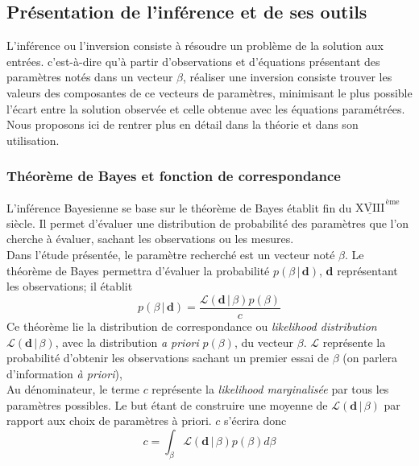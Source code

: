 \documentclass[a4paper,12pt]{article}
\newcommand{\bepar}[1]{
	\left( #1 \right)  
}
\newcommand\bk{\color{black}}
\newcommand\brick{\color{brick}}
\newcommand\dsb{\color{dsb}}
\newcommand{\cad}{c'est-à-dire}
\numberwithin{equation}{section} %
\begin{document}
 
\brick \subsection{Présentation de l'inférence et de ses outils} \bk
\noindent L'inférence ou l'inversion consiste à résoudre un problème de la solution aux entrées. \cad $ $ qu'à partir d'observations et d'équations présentant des paramètres notés dans un vecteur $\beta$, réaliser une inversion consiste trouver les valeurs des composantes de ce vecteurs de paramètres, minimisant le plus possible l'écart entre la solution observée et celle obtenue avec les équations paramétrées. \\
Nous proposons ici de rentrer plus en détail dans la théorie et dans son utilisation.

\dsb \subsubsection{Théorème de Bayes et fonction de correspondance} \bk
\noindent L'inférence Bayesienne se base sur le théorème de Bayes établit fin du $\overline{\underline{\text{XVIII}}}^{\, \text{ème}}$ siècle. Il permet d'évaluer une distribution de probabilité des paramètres que l'on cherche à évaluer, sachant les observations ou les mesures.\\
Dans l'étude présentée, le paramètre recherché est un vecteur noté $\beta$. Le théorème de Bayes permettra d'évaluer la probabilité $p\bepar{\beta\,|\,\textbf{d}}$, \textbf{d} représentant les observations; il établit 
\begin{equation}
p\bepar{\beta\,|\,\textbf{d}} = \frac{\mathcal{L}\bepar{\textbf{d}\,|\,\beta}p\bepar{\beta}}{c} %
\end{equation}
Ce théorème lie la distribution de correspondance ou \textit{likelihood distribution} $\mathcal{L}\bepar{\textbf{d}\,|\,\beta}$, avec la distribution \textit{a priori} $p\bepar{\beta}$, du vecteur $\beta$. $\mathcal{L}$ représente la probabilité d'obtenir les observations sachant un premier essai de $\beta$ (on parlera d'information \textit{à priori}),\\
Au dénominateur, le terme $c$ représente la \textit{likelihood marginalisée} par tous les paramètres possibles. Le but étant de construire une moyenne de $\mathcal{L}\bepar{\textbf{d}\,|\,\beta}$ par rapport aux choix de paramètres à priori. $c$ s'écrira donc 
\begin{equation}
c = \int_{\beta} \mathcal{L}\bepar{\textbf{d}\,|\,\beta}p\bepar{\beta} d\beta
\end{equation} \\
\end{document}
